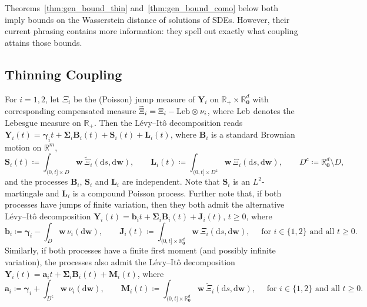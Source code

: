 \documentclass[en,oneside,bbfont,article]{amsart}
\theoremstyle{remark}
\theoremstyle{definition}
\theoremstyle{definition}
\newcommand\R{\mathbb{R}}
\newcommand\1{\mathds{1}}
\newcommand{\Leb}{\text{\normalfont Leb}}
\renewcommand\ge{\geqslant}
\newcommand\co{\mathsf{c}}
\newcommand{\D}{\mathrm{d}}
\newcommand{\wt}[1]{\widetilde{#1}}
\begin{document}
Theorems~\ref{thm:gen_bound_thin} and~\ref{thm:gen_bound_como} below both imply bounds on the Wasserstein distance of solutions of SDEs. However, their current phrasing contains more information: they spell out exactly what coupling attains those bounds.

\subsection{Thinning Coupling}\label{sec_thinning_coup}
For $i=1,2$, let $\Xi_i$ be the (Poisson) jump measure of  $\bm{Y}_i$ on $\R_+\times \R^d_{\bm{0}}$ with corresponding compensated measure $\wt\Xi_{i}=\Xi_{i}-\Leb\otimes\nu_{i}$, where $\Leb$ denotes the Lebesgue measure on $\R_+$. Then the L\'evy--It\^o decomposition reads $\bm{Y}_i(t)=\bm{\gamma}_{i} t+\bm{\Sigma}_{i}\bm{B}_{i}(t)+\bm{S}_{i}(t)+\bm{L}_{i}(t)$, where $\bm{B}_i$ is a standard Brownian motion on $\R^m$,
\begin{equation}
\label{eq:thinning_coupling_S_j_L_j}
\bm{S}_i(t)
\coloneqq\int_{(0,t]\times D} \bm{w}\,\wt\Xi_i(\D s,\D\bm{w}),
\qquad
\bm{L}_i(t)
\coloneqq\int_{(0,t]\times D^\co}\bm{w}\,\Xi_i(\D s,\D\bm{w}),
\qquad D^\co\coloneqq \R^d_{\bm0} \setminus D,
\end{equation}
and the processes $\bm{B}_i$, $\bm{S}_i$ and $\bm{L}_i$ are independent. Note that $\bm{S}_i$ is an $L^2$-martingale and $\bm{L}_i$ is a compound Poisson process. Further note that, if both processes have jumps of finite variation, then they both admit the alternative L\'evy--It\^o decomposition $\bm{Y}_i(t)=\bm{b}_{i} t+\bm{\Sigma}_{i}\bm{B}_{i}(t)+\bm{J}_{i}(t)$, $t\ge 0$, where
\begin{equation}
\label{eq:thinning_coupling_FV}
\bm{b}_i
\coloneqq\bm{\gamma}_i-\int_{D}\bm{w}\,\nu_i(\D\bm{w}),
\qquad
\bm{J}_i(t)
\coloneqq\int_{(0,t]\times \R^d_{\bm 0}} \bm{w}\,\Xi_i(\D s,\D\bm{w}),
\quad \text{ for }i\in \{1,2\} \text{ and all }t\ge 0.
\end{equation} Similarly, if both processes have a finite first moment (and possibly infinite variation), the processes also admit the L\'evy--It\^o decomposition $\bm{Y}_i(t)=\bm{a}_i t+\bm\Sigma_i\bm{B}_i(t)+\bm{M}_i(t)$, where
\begin{equation}
\label{eq:thinning_coupling_FM}
\bm{a}_i
\coloneqq\bm{\gamma}_i+\int_{D^\co}\bm{w}\,\nu_i(\D\bm{w}),
\qquad
\bm{M}_i(t)
\coloneqq\int_{(0,t]\times \R^d_{\bm 0}} \bm{w}\,\wt\Xi_i(\D s,\D\bm{w}),
\quad \text{ for }i\in \{1,2\} \text{ and all }t\ge 0.
\end{equation}
\end{document}
